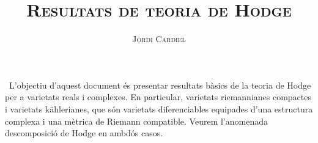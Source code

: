 \documentclass[compress]{article}
\title{\large{\textsc{\textbf{Resultats de teoria de Hodge}}}}
\author{\textsc{Jordi Cardiel}}
\date{}
\begin{document}
\maketitle
\tableofcontents
\,\newline
L'objectiu d'aquest document és presentar resultats bàsics de la teoria de Hodge per a varietats reals i complexes. En particular, varietats riemannianes compactes i varietats kählerianes, que són varietats diferenciables equipades d'una estructura complexa i una mètrica de Riemann compatible. Veurem l'anomenada descomposició de Hodge en ambdós casos.


\printbibliography
\end{document}

